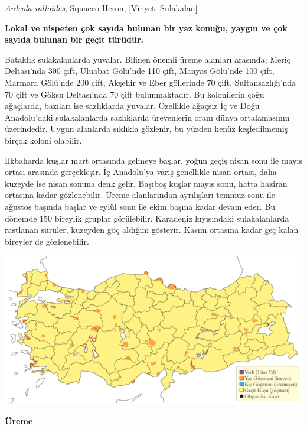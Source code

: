 \documentclass[
  letterpaper,
  DIV=11,
  numbers=noendperiod]{scrreprt}
\begin{document}
\emph{Ardeola ralloides}, Squacco Heron, {[}Vinyet: Sulakalan{]}

\textbf{Lokal ve nispeten çok sayıda bulunan bir yaz konuğu, yaygın ve
çok sayıda bulunan bir geçit türüdür.}

Bataklık sulakalanlarda yuvalar. Bilinen önemli üreme alanları arasında;
Meriç Deltası'nda 300 çift, Uluabat Gölü'nde 110 çift, Manyas Gölü'nde
100 çift, Marmara Gölü'nde 200 çift, Akşehir ve Eber göllerinde 70 çift,
Sultansazlığı'nda 70 çift ve Göksu Deltası'nda 70 çift bulunmaktadır. Bu
kolonilerin çoğu ağaçlarda, bazıları ise sazlıklarda yuvalar. Özellikle
ağaçsız İç ve Doğu Anadolu'daki sulakalanlarda sazlıklarda üreyenlerin
oranı dünya ortalamasının üzerindedir. Uygun alanlarda sıklıkla
gözlenir, bu yüzden henüz keşfedilmemiş birçok koloni olabilir.

İlkbaharda kuşlar mart ortasında gelmeye başlar, yoğun geçiş nisan sonu
ile mayıs ortası arasında gerçekleşir. İç Anadolu'ya varış genellikle
nisan ortası, daha kuzeyde ise nisan sonuna denk gelir. Başıboş kuşlar
mayıs sonu, hatta haziran ortasına kadar gözlenebilir. Üreme
alanlarından ayrılışları temmuz sonu ile ağustos başında başlar ve eylül
sonu ile ekim başına kadar devam eder. Bu dönemde 150 bireylik gruplar
görülebilir. Karadeniz kıyısındaki sulakalanlarda rastlanan sürüler,
kuzeyden göç aldığını gösterir. Kasım ortasına kadar geç kalan bireyler
de gözlenebilir.

\includegraphics{images/harita_Page_067.png}

\textbf{Üreme}
\end{document}
